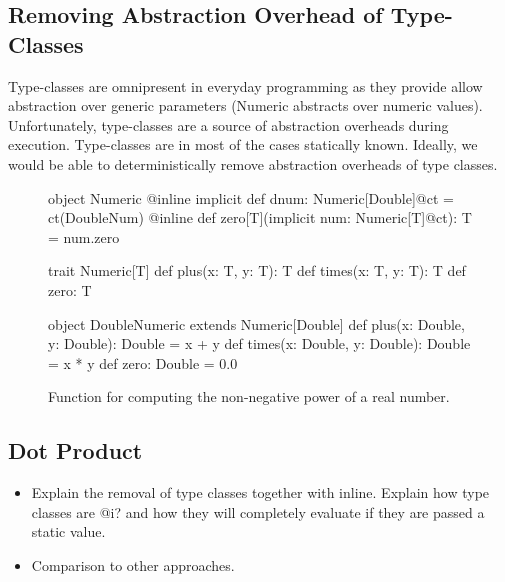 \subsection{Removing Abstraction Overhead of Type-Classes}
\label{sct:type-classes-removal}
Type-classes are omnipresent in everyday programming as they provide allow abstraction over
 generic parameters (\eg Numeric abstracts over numeric values). Unfortunately,
 type-classes are a source of abstraction overheads during execution. Type-classes
 are in most of the cases statically known. Ideally, we would be able to
 deterministically remove abstraction overheads of type classes.

\begin{figure}
\begin{listing}
object Numeric {
  @inline implicit def dnum: Numeric[Double]@ct =
    ct(DoubleNum)
  @inline def zero[T](implicit num: Numeric[T]@ct): T =
    num.zero
}

trait Numeric[T] {
  def plus(x: T, y: T): T
  def times(x: T, y: T): T
  def zero: T
}

object DoubleNumeric extends Numeric[Double] {
  def plus(x: Double, y: Double): Double = x + y
  def times(x: Double, y: Double): Double = x * y
  def zero: Double = 0.0
}
\end{listing}
\caption{\label{fig:numeric} Function for computing the non-negative power of a real number.}
\end{figure}


\subsection{Dot Product}
\label{sct:dot-product}
\begin{itemize}
  \item Explain the removal of type classes together with inline. Explain how type classes
  are @i? and how they will completely evaluate if they are passed a static value.
  \item Comparison to other approaches.
\end{itemize}

